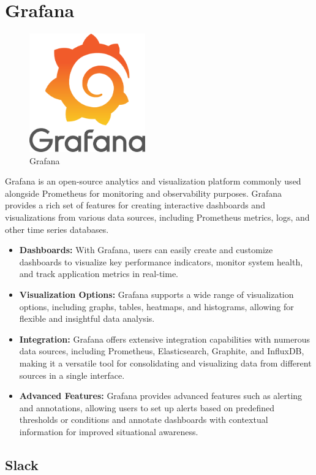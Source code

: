 \section{Grafana}

  
\begin{figure}[H]
  \centering
  \includegraphics[width=5cm]{Logos/grafana-logo.png}
  \caption{Grafana}
\end{figure}
Grafana is an open-source analytics and visualization platform commonly used alongside Prometheus for monitoring and observability purposes.
Grafana provides a rich set of features for creating interactive dashboards and visualizations from various data sources, including Prometheus metrics, logs, and other time series databases.

\begin{itemize}
  \item \textbf{Dashboards:} With Grafana, users can easily create and customize dashboards to visualize key performance indicators, monitor system health, and track application metrics in real-time.
  \item \textbf{Visualization Options:} Grafana supports a wide range of visualization options, including graphs, tables, heatmaps, and histograms, allowing for flexible and insightful data analysis.
  \item \textbf{Integration:} Grafana offers extensive integration capabilities with numerous data sources, including Prometheus, Elasticsearch, Graphite, and InfluxDB, making it a versatile tool for consolidating and visualizing data from different sources in a single interface.
  \item \textbf{Advanced Features:} Grafana provides advanced features such as alerting and annotations, allowing users to set up alerts based on predefined thresholds or conditions and annotate dashboards with contextual information for improved situational awareness.
\end{itemize}

\subsection{Slack}

